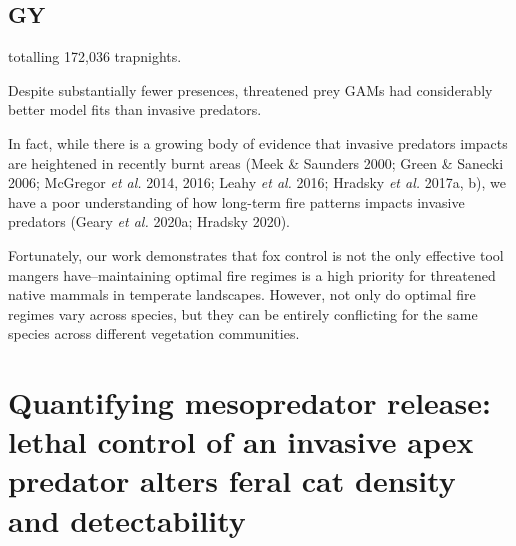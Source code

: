 \documentclass[11pt,a4paper,titlepage,twoside,openright]{style/unimelbthesis}
\begin{document}
\begin{mainmatter}
\hypertarget{gy}{%
\section{GY}\label{gy}}

totalling 172,036 trapnights.

Despite substantially fewer presences, threatened prey GAMs had considerably better model fits than invasive predators.

In fact, while there is a growing body of evidence that invasive predators impacts are heightened in recently burnt areas (Meek \& Saunders 2000; Green \& Sanecki 2006; McGregor \emph{et al.} 2014, 2016; Leahy \emph{et al.} 2016; Hradsky \emph{et al.} 2017a, b), we have a poor understanding of how long-term fire patterns impacts invasive predators (Geary \emph{et al.} 2020a; Hradsky 2020).

Fortunately, our work demonstrates that fox control is not the only effective tool mangers have--maintaining optimal fire regimes is a high priority for threatened native mammals in temperate landscapes. However, not only do optimal fire regimes vary across species, but they can be entirely conflicting for the same species across different vegetation communities.

\hypertarget{density}{%
\chapter{Quantifying mesopredator release: lethal control of an invasive apex predator alters feral cat density and detectability}\label{density}}

\hypertarget{abstract-2}{%
}
\end{mainmatter}
\end{document}
